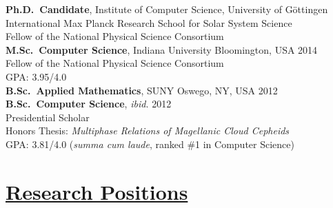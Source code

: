   \noindent\textbf{Ph.D.~Candidate}, Institute of Computer Science, University of G\"ottingen\\ %
  International Max Planck Research School for Solar System Science\\
  Fellow of the National Physical Science Consortium\vspace{2mm}\\%
  \noindent\textbf{M.Sc.~Computer Science}, Indiana University Bloomington, USA \hfill 2014\\
  Fellow of the National Physical Science Consortium \\
  GPA: 3.95/4.0\vspace{2mm}\\
  \textbf{B.Sc.~Applied Mathematics}, SUNY Oswego, NY, USA \hfill 2012\\
  \textbf{B.Sc.~Computer Science}, \emph{ibid.} \hfill 2012\\
  Presidential Scholar\\
  Honors Thesis: \emph{Multiphase Relations of Magellanic Cloud Cepheids} \\
  GPA: 3.81/4.0 (\emph{summa cum laude}, ranked \#1 in Computer Science)

  \section*{\sc\underline{Research Positions}}
  \vspace*{-2mm}
  
